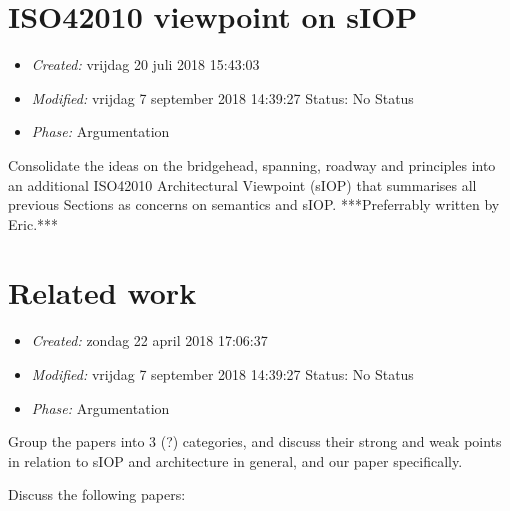 \documentclass[a4paper,11pt,oneside,oldfontcommands]{memoir}
\theoremstyle{definition}
\theoremstyle{break}		%
\numberwithin{equation}{chapter}
\numberwithin{figure}{chapter}
\begin{document}
\hypertarget{iso42010-viewpoint-on-siop}{%
\chapter{ISO42010 viewpoint on sIOP}\label{iso42010-viewpoint-on-siop}}

\begin{itemize}
\tightlist
\item
  \emph{Created:} vrijdag 20 juli 2018 15:43:03
\item
  \emph{Modified:} vrijdag 7 september 2018 14:39:27 Status: No Status
\item
  \emph{Phase:} Argumentation
\end{itemize}

\begin{synopsis}
Consolidate the ideas on the bridgehead, spanning, roadway and principles into an additional ISO42010 Architectural Viewpoint (sIOP) that summarises all previous Sections as concerns on semantics and sIOP. ***Preferrably written by Eric.***

\end{synopsis}

\hypertarget{related-work}{%
\chapter{Related work}\label{related-work}}

\begin{itemize}
\tightlist
\item
  \emph{Created:} zondag 22 april 2018 17:06:37
\item
  \emph{Modified:} vrijdag 7 september 2018 14:39:27 Status: No Status
\item
  \emph{Phase:} Argumentation
\end{itemize}

\begin{synopsis}
Group the papers into 3 (?) categories, and discuss their strong and weak points in relation to sIOP and architecture in general, and our paper specifically.

\end{synopsis}

Discuss the following papers:
\end{document}

